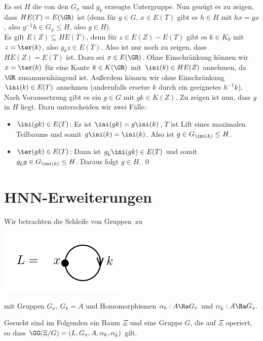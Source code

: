 \bew Es sei $H$ die von den $G_x$ und $g_k$ erzeugte Untergruppe.
Nun genügt es zu zeigen, dass $H E(T)=E(\GR)$ ist (denn für $g\in G$,
$x\in E(T)$ gibt es $h\in H$ mit $hx=gx$, also
$g^{-1}h\in G_x \leq H$, also $g\in H$).\\
Es gilt $E(Z)\subseteq H E(T)$, denn für $z\in E(Z)-E(T)$ gibt es
$k\in K_0$ mit $z=\ter(k)$, also $g_k z \in E(T)$.
Also ist nur noch zu zeigen, dass $HE(Z)=E(T)$ ist.
Dazu sei $x\in E(\GR)$. Ohne Einschränkung können wir $x=\ter(k)$
für eine Kante $k\in K(\GR)$ mit $\ini(k)\in HE(Z)$ annehmen,
da $\GR$ zusammenhängend ist. Außerdem können wir ohne Einschränkung
$\ini(k)\in E(T)$ annehmen (andernfalls ersetze $k$ durch ein
geeignetes $h^{-1}k$).
Nach Voraussetzung gibt es ein $g\in G$ mit $gk\in K(Z)$.
Zu zeigen ist nun, dass $g$ in $H$ liegt. Dazu unterscheiden wir
zwei Fälle:
\begin{itemize}
\item
$\ini(gk)\in E(T)$: Es ist $\ini(gk)=g\ini(k)$, $T$ ist Lift eines
maximalen Teilbaums und somit $g\ini(k)=\ini(k)$.
Also ist $g\in G_{\ini(k)}\leq H$.\\
\item
$\ter(gk)\in E(T)$: Dann ist $g_{\bar{k}} \ini(gk)\in E(T)$
und somit $g_{\bar{k}} g \in G_{\ini(k)}\leq H$.
Daraus folgt $g\in H$.
\qed
\end{itemize}



\section{HNN-Erweiterungen}\label{sec_hnn}

Wir betrachten die \glqq Schleife von Gruppen\grqq\ zu
\begin{center}
	\includegraphics{grugraImages/L}
\end{center}
mit Gruppen $G_x$, $G_k=A$ und Homomorphismen
$\alpha_k:A\Ra G_x$ und $\alpha_{\bar{k}}:A\Ra G_x$.

Gesucht sind im Folgenden ein Baum $\Xi$ und eine Gruppe $G$,
die auf $\Xi$ operiert, so dass
$\GG(\Xi/G) = (L,G_x,A,\alpha_k,\alpha_{\bar{k}})$ gilt.

